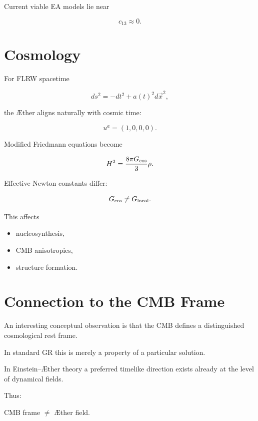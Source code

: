 \documentclass[11pt,a4paper]{article}
\begin{document}
Current viable EA models lie near

\begin{equation}
c_{13}\approx 0.
\end{equation}

\section{Cosmology}

For FLRW spacetime

\begin{equation}
ds^2
=
-dt^2
+a(t)^2 d\vec{x}^2,
\end{equation}

the \AE ther aligns naturally with cosmic time:

\begin{equation}
u^a=(1,0,0,0).
\end{equation}

Modified Friedmann equations become

\begin{equation}
H^2
=
\frac{8\pi G_{\rm cos}}{3}\rho .
\end{equation}

Effective Newton constants differ:

\begin{equation}
G_{\rm cos}
\neq
G_{\rm local}.
\end{equation}

This affects

\begin{itemize}
\item nucleosynthesis,
\item CMB anisotropies,
\item structure formation.
\end{itemize}

\section{Connection to the CMB Frame}

An interesting conceptual observation is that the CMB defines a
distinguished cosmological rest frame.

In standard GR this is merely a property of a particular solution.

In Einstein--\AE ther theory a preferred timelike direction exists
already at the level of dynamical fields.

Thus:

\begin{center}
CMB frame $\neq$ \AE ther field.
\end{center}
\end{document}
